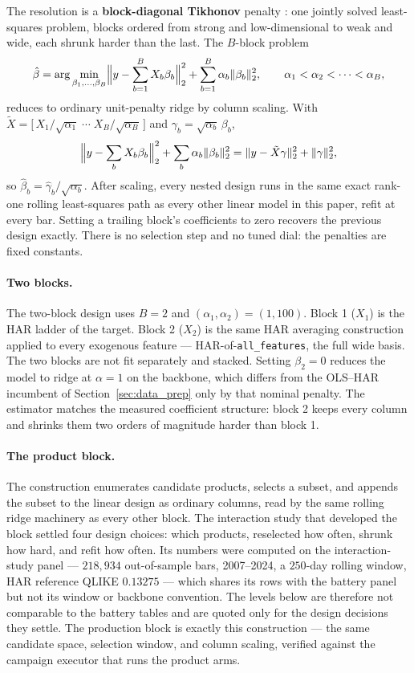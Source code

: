 The resolution is a \textbf{block-diagonal Tikhonov} penalty
\citep{HoerlKennard1970,vanWieringen2023ridge,vandeWiel2021multipenalty}:
one jointly solved least-squares problem, blocks ordered from strong
and low-dimensional to weak and wide, each shrunk harder than the
last. The $B$-block problem
\[
\hat\beta
= \arg\min_{\beta_1,\dots,\beta_B}
  \Bigl\lVert y - \sum_{b=1}^{B} X_b \beta_b \Bigr\rVert_2^2
  + \sum_{b=1}^{B} \alpha_b \lVert \beta_b \rVert_2^2,
\qquad
\alpha_1 < \alpha_2 < \cdots < \alpha_B,
\]
reduces to ordinary unit-penalty ridge by column scaling. With
$\tilde X = \bigl[\, X_1/\sqrt{\alpha_1} \;\cdots\; X_B/\sqrt{\alpha_B} \,\bigr]$
and $\gamma_b = \sqrt{\alpha_b}\,\beta_b$,
\[
\Bigl\lVert y - \sum_b X_b \beta_b \Bigr\rVert_2^2
+ \sum_b \alpha_b \lVert \beta_b \rVert_2^2
= \lVert y - \tilde X \gamma \rVert_2^2 + \lVert \gamma \rVert_2^2,
\]
so $\hat\beta_b = \hat\gamma_b / \sqrt{\alpha_b}$. After scaling, every
nested design runs in the same exact rank-one rolling
least-squares path as every other linear model in this paper, refit
at every bar. Setting a trailing block's coefficients to zero
recovers the previous design exactly. There is no selection step and
no tuned dial: the penalties are fixed constants.

\paragraph{Two blocks.}
The two-block design uses $B = 2$ and $(\alpha_1, \alpha_2) = (1, 100)$.
Block 1 ($X_1$) is the HAR ladder of the target. Block 2 ($X_2$) is
the same HAR averaging construction applied to every exogenous
feature --- HAR-of-\texttt{all\_features}, the full wide basis. The
two blocks are not fit separately and stacked. Setting
$\beta_2 = 0$ reduces the model to ridge at $\alpha = 1$ on the
backbone, which differs from the OLS--HAR incumbent of
Section~\ref{sec:data_prep} only by that nominal penalty. The
estimator matches the measured coefficient structure: block 2 keeps
every column and shrinks them two orders of magnitude harder than
block 1.

\paragraph{The product block.}
\label{sec:nonlinear_product}
\label{sec:product_block}
The construction enumerates candidate products, selects a subset, and
appends the subset to the linear design as ordinary columns, read by the
same rolling ridge machinery as every other block. The interaction study
that developed the block settled four design choices: which products,
reselected how often, shrunk how hard, and refit how often. Its numbers
were computed on the interaction-study panel --- $218{,}934$ out-of-sample
bars, 2007--2024, a $250$-day rolling window, HAR reference QLIKE
$0.13275$ --- which shares its rows with the battery panel but not its
window or backbone convention. The levels below are therefore not
comparable to the battery tables and are quoted only for the design
decisions they settle.
The production block is exactly this construction --- the same candidate
space, selection window, and column scaling, verified against the campaign
executor that runs the product arms.

